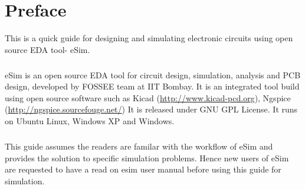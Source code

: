 \chapter*{Preface}

This is a quick guide for designing and simulating electronic circuits using open source  EDA tool- eSim. 
\paragraph{}

eSim is an open source EDA tool for circuit design, simulation, analysis and PCB design, developed by FOSSEE team at IIT Bombay. It is an integrated tool build using open source software such as Kicad (\url{http://www.kicad-pcd.org}), Ngspice (\url{http://ngspice.sourcefouge.net/}) It is released under GNU GPL License. It runs on Ubuntu Linux, Windows XP and Windows.

\paragraph{}
This guide assumes the readers are familar with the workflow of eSim and provides the solution to specific simulation problems. Hence new users of eSim are requested to have a read on esim user manual before using this guide for simulation.

